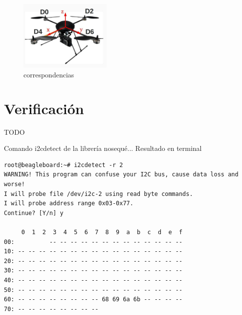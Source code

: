 \documentclass[spanish,12pt,a4paper,titlepage]{report}
\begin{document}
\begin{figure}[h!]
	\centering
	\includegraphics[width=0.4\textwidth]{./pics/correspondencias.jpg}
	\caption{correspondencias}
	\label{fig:correspondencias}
\end{figure}

\section{Verificación}
\begin{huge}
TODO
\end{huge}

Comando i2cdetect de la librería nosequé... Resultado en terminal
\begin{verbatim}
root@beagleboard:~# i2cdetect -r 2
WARNING! This program can confuse your I2C bus, cause data loss and worse!
I will probe file /dev/i2c-2 using read byte commands.
I will probe address range 0x03-0x77.
Continue? [Y/n] y

     0  1  2  3  4  5  6  7  8  9  a  b  c  d  e  f
00:          -- -- -- -- -- -- -- -- -- -- -- -- -- 
10: -- -- -- -- -- -- -- -- -- -- -- -- -- -- -- -- 
20: -- -- -- -- -- -- -- -- -- -- -- -- -- -- -- -- 
30: -- -- -- -- -- -- -- -- -- -- -- -- -- -- -- -- 
40: -- -- -- -- -- -- -- -- -- -- -- -- -- -- -- -- 
50: -- -- -- -- -- -- -- -- -- -- -- -- -- -- -- -- 
60: -- -- -- -- -- -- -- -- 68 69 6a 6b -- -- -- -- 
70: -- -- -- -- -- -- -- --
\end{verbatim}
\end{document}
